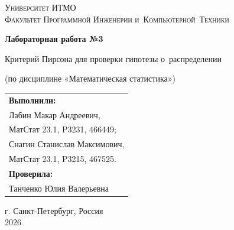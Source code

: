 \begin{titlepage}
    \begin{center}
        \large
        \textsc{Университет ИТМО\\
        Факультет Программной Инженерии и~Компьютерной~Техники}
        \vspace*{4cm}
            
        \LARGE
        \textbf{Лабораторная работа №3}

        \vspace{0.5cm}
        \LARGE

         Критерий Пирсона для проверки гипотезы о~распределении
            
        \vspace{0.5cm}
        \large
        (по дисциплине «Математическая статистика»)

        \vspace{1.5cm}

        \hfill\large
        \begin{tabular}{@{}l@{}}
        \textbf{Выполнили:}\\[2mm]
        Лабин Макар Андреевич,\\
        МатСтат 23.1, P3231, 466449;\\
        Снагин Станислав Максимович,\\
        МатСтат 23.1, P3215, 467525.\\[2mm]
        \textbf{Проверила:}\\[2mm]
        Танченко Юлия Валерьевна
        \end{tabular}
            
        \vfill
            
        \vspace{0.8cm}
            
            
        \Large
        г. Санкт-Петербург, Россия\\
        2026
            
    \end{center}
\end{titlepage}

\renewcommand{\thefootnote}{[\arabic{footnote}]}